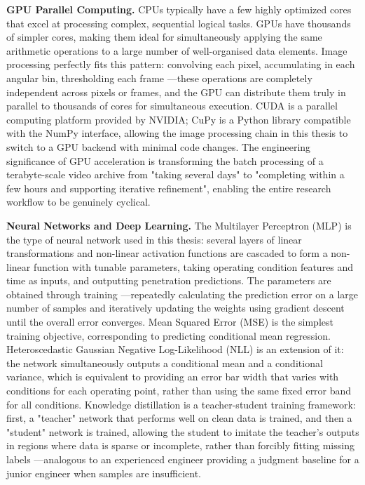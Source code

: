 \documentclass[english, 12pt, a4paper, elec, utf8, a-2b, online]{aaltothesis}
\begin{document}
\textbf{GPU Parallel Computing.}
CPUs typically have a few highly optimized cores that excel at processing complex, 
sequential logical tasks. 
GPUs have thousands of simpler cores, 
making them ideal for simultaneously applying the same arithmetic operations to a large number 
of well-organised data elements. 
Image processing perfectly fits this pattern: 
convolving each pixel, accumulating in each angular bin, thresholding each frame
---these operations are completely independent across pixels or frames, 
and the GPU can distribute them truly in parallel to thousands of cores for simultaneous execution. 
CUDA is a parallel computing platform provided by NVIDIA; 
CuPy is a Python library compatible with the NumPy interface, 
allowing the image processing chain in this thesis to switch to a GPU backend 
with minimal code changes. 
The engineering significance of GPU acceleration is transforming the batch processing of 
a terabyte-scale video archive from "taking several days" to "completing within a few hours and supporting iterative refinement", enabling the entire research workflow to be genuinely cyclical.

\textbf{Neural Networks and Deep Learning.}
The Multilayer Perceptron (MLP) is the type of neural network used in this thesis: 
several layers of linear transformations and non-linear activation functions are cascaded 
to form a non-linear function with tunable parameters, 
taking operating condition features and time as inputs, 
and outputting penetration predictions. 
The parameters are obtained through training
---repeatedly calculating the prediction error on a large number of samples 
and iteratively updating the weights using gradient descent until the overall error converges. 
Mean Squared Error (MSE) is the simplest training objective, 
corresponding to predicting conditional mean regression. 
Heteroscedastic Gaussian Negative Log-Likelihood (NLL) is an extension of it: 
the network simultaneously outputs a conditional mean and a conditional variance, 
which is equivalent to providing an error bar width that varies with conditions 
for each operating point, 
rather than using the same fixed error band for all conditions. 
Knowledge distillation is a teacher-student training framework: 
first, a "teacher" network that performs well on clean data is trained, 
and then a "student" network is trained, allowing the student to imitate the teacher's outputs 
in regions where data is sparse or incomplete, 
rather than forcibly fitting missing labels
---analogous to an experienced engineer providing a judgment baseline 
for a junior engineer when samples are insufficient.
\end{document}
